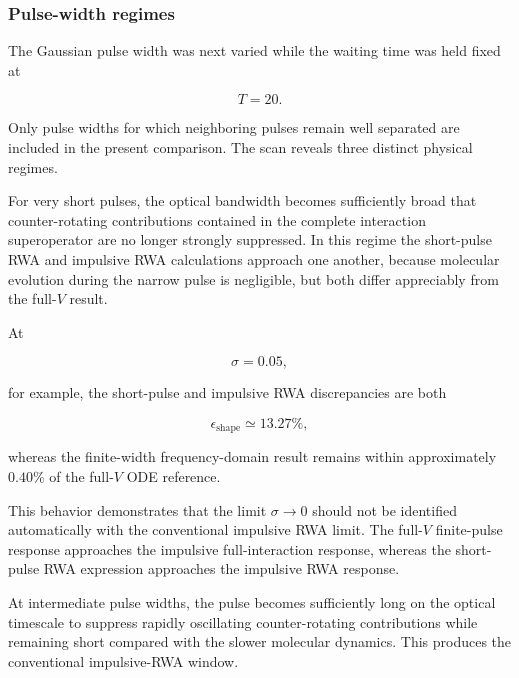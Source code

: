 \documentclass[11pt]{article}
\begin{document}
\subsubsection{Pulse-width regimes}

The Gaussian pulse width was next varied while the waiting time was
held fixed at

\begin{equation}
T=20.
\end{equation}

Only pulse widths for which neighboring pulses remain well separated
are included in the present comparison.  The scan reveals three
distinct physical regimes.

For very short pulses, the optical bandwidth becomes sufficiently broad
that counter-rotating contributions contained in the complete
interaction superoperator are no longer strongly suppressed.  In this
regime the short-pulse RWA and impulsive RWA calculations approach one
another, because molecular evolution during the narrow pulse is
negligible, but both differ appreciably from the full-$V$ result.

At

\begin{equation}
\sigma=0.05,
\end{equation}

for example, the short-pulse and impulsive RWA discrepancies are both

\begin{equation}
\epsilon_{\mathrm{shape}}
\simeq
13.27\%,
\end{equation}

whereas the finite-width frequency-domain result remains within
approximately $0.40\%$ of the full-$V$ ODE reference.

This behavior demonstrates that the limit $\sigma\rightarrow0$ should
not be identified automatically with the conventional impulsive RWA
limit.  The full-$V$ finite-pulse response approaches the impulsive
full-interaction response, whereas the short-pulse RWA expression
approaches the impulsive RWA response.

At intermediate pulse widths, the pulse becomes sufficiently long on
the optical timescale to suppress rapidly oscillating
counter-rotating contributions while remaining short compared with the
slower molecular dynamics.  This produces the conventional
impulsive-RWA window.
\end{document}
